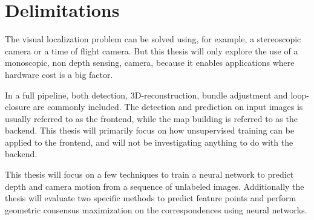 \section{Delimitations}

The visual localization problem can be solved using, for example, a stereoscopic camera or a time of flight camera. But this thesis will only explore the use of a monoscopic, non depth sensing, \abbrRGB camera, because it enables applications where hardware cost is a big factor.

In a full \abbrSFM pipeline, both detection, 3D-reconstruction, bundle adjustment and loop-closure are commonly included. The detection and prediction on input images is usually referred to as the \abbrSFM frontend, while the map building is referred to as the backend. This thesis will primarily focus on how unsupervised training can be applied to the frontend, and will not be investigating anything to do with the backend.

This thesis will focus on a few techniques to train a neural network to predict depth and camera motion from a sequence of unlabeled images. Additionally the thesis will evaluate two specific methods to predict feature points and perform geometric consensus maximization on the correspondences using neural networks.